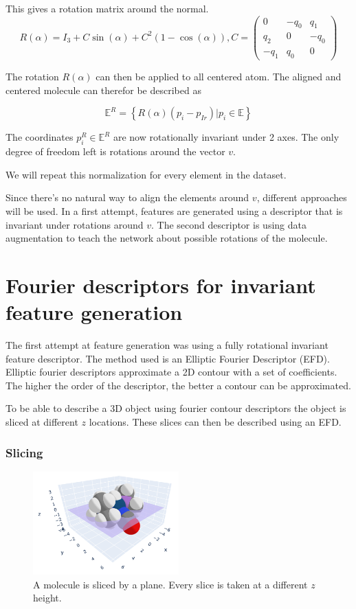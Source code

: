 This gives a rotation matrix around the normal.
$$
R(\alpha) = I_3 + C \sin(\alpha) + C^2(1 - \cos(\alpha)), C =
\begin{pmatrix}
  0 & -q_0 & q_1 \\
  q_2 & 0 & -q_0\\
  -q_1 & q_0 & 0
\end{pmatrix}
$$


The rotation $R(\alpha)$ can then be applied to all centered atom.
The aligned and centered molecule can therefor be described as

$$ 
\mathbb{E}^R = \left\{ R(\alpha) (p_i - p_{Ir}) |  p_i \in \mathbb{E} \right\}
$$

The coordinates $p^R_i \in \mathbb{E}^R$ are now rotationally invariant under 2 axes. 
The only degree of freedom left is rotations around the vector $v$. 

We will repeat this normalization for every element in the dataset.

Since there's no natural way to align the elements around $v$, different approaches will be used.
In a first attempt, features are generated using a descriptor that is invariant under rotations around $v$.
The second descriptor is using data augmentation to teach the network about possible rotations of the molecule.

\section{Fourier descriptors for invariant feature generation}

The first attempt at feature generation was using a fully rotational invariant feature descriptor.
The method used is an Elliptic Fourier Descriptor (EFD).
Elliptic fourier descriptors approximate a 2D contour with a set of coefficients.
The higher the order of the descriptor, the better a contour can be approximated.

To be able to describe a 3D object using fourier contour descriptors the object is sliced at different $z$ locations.
These slices can then be described using an EFD.

\subsubsection{Slicing}

\begin{figure} [h]
  \centering
  \includegraphics[width=0.5\textwidth]{figures/fourier/slice3d.png} %
  \caption{A molecule is sliced by a plane. Every slice is taken at a different $z$ height.}
  \label{fig:slice3d}
\end{figure}

